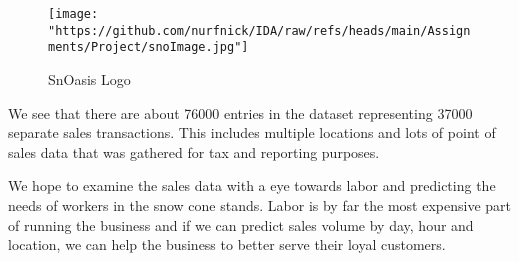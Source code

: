 \documentclass[
]{article}
\begin{document}
\begin{figure}
\centering
\texttt{[image: "https://github.com/nurfnick/IDA/raw/refs/heads/main/Assignments/Project/snoImage.jpg"]}
\caption{SnOasis Logo}
\end{figure}

We see that there are about 76000 entries in the dataset representing
37000 separate sales transactions. This includes multiple locations and
lots of point of sales data that was gathered for tax and reporting
purposes.

We hope to examine the sales data with a eye towards labor and
predicting the needs of workers in the snow cone stands. Labor is by far
the most expensive part of running the business and if we can predict
sales volume by day, hour and location, we can help the business to
better serve their loyal customers.
\end{document}
